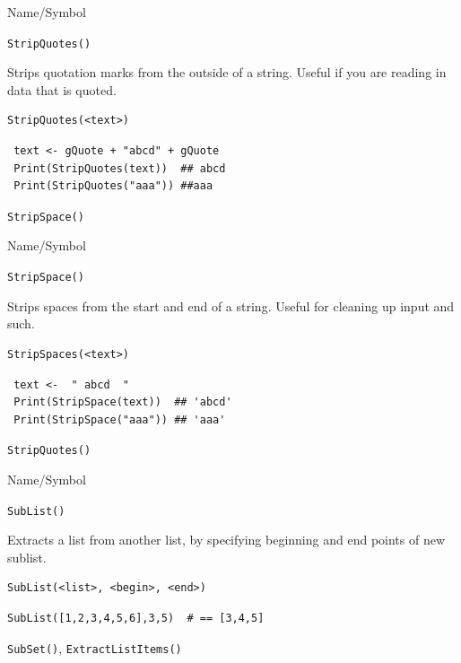 \begin{desc}{Name/Symbol}
\item[Name/Symbol]  	\verb+StripQuotes()+

\item[Description] 	Strips quotation marks from the outside of a
  string.  Useful if you are reading in data that is quoted.


\item[Usage]
\begin{verbatim}
StripQuotes(<text>)
\end{verbatim}

\item[Example]     	
\begin{verbatim}
 text <- gQuote + "abcd" + gQuote
 Print(StripQuotes(text))  ## abcd
 Print(StripQuotes("aaa")) ##aaa
\end{verbatim}

\item[See Also]    	\verb+StripSpace()+
\end{desc}



\begin{desc}{Name/Symbol}
\item[Name/Symbol]  	\verb+StripSpace()+

\item[Description] 	Strips spaces from the start and end of a
  string.  Useful for cleaning up input and such.


\item[Usage]
\begin{verbatim}
StripSpaces(<text>)
\end{verbatim}

\item[Example]     	
\begin{verbatim}
 text <-  " abcd  "
 Print(StripSpace(text))  ## 'abcd'
 Print(StripSpace("aaa")) ## 'aaa'
\end{verbatim}

\item[See Also]    	\verb+StripQuotes()+
\end{desc}




\begin{desc}{Name/Symbol}
\item[Name/Symbol]  	\verb+SubList()+

\item[Description] 	Extracts a list from another list, by specifying 
	     	beginning and end points of new sublist.

\item[Usage]
\begin{verbatim}
SubList(<list>, <begin>, <end>)
\end{verbatim}

\item[Example]     	
\begin{verbatim}
SubList([1,2,3,4,5,6],3,5)	# == [3,4,5]
\end{verbatim}

\item[See Also]    	\verb+SubSet()+, \verb+ExtractListItems()+
\end{desc}




